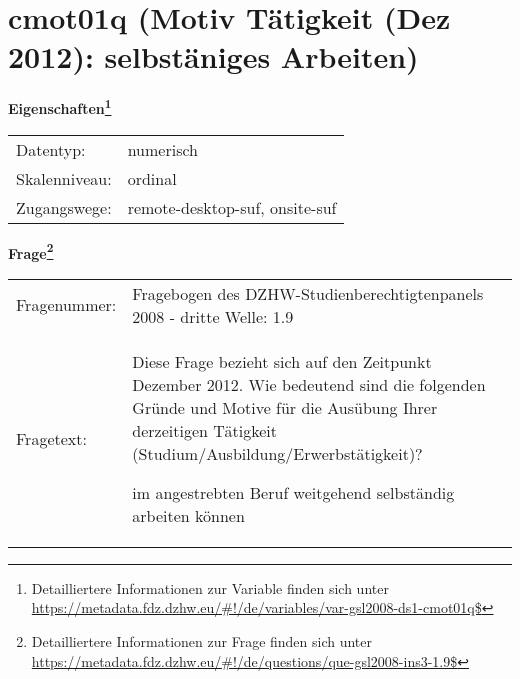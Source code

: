
    \setcounter{footnote}{0}

    \vspace*{-1.8cm}
	\section{cmot01q (Motiv Tätigkeit (Dez 2012): selbstäniges Arbeiten)}
	\label{section:cmot01q}



    \vspace*{0.5cm}
    \noindent\textbf{Eigenschaften\footnote{Detailliertere Informationen zur Variable finden sich unter
		\url{https://metadata.fdz.dzhw.eu/\#!/de/variables/var-gsl2008-ds1-cmot01q$}}}\\
	\begin{tabularx}{\hsize}{@{}lX}
	Datentyp: & numerisch \\
	Skalenniveau: & ordinal \\
	Zugangswege: &
	  remote-desktop-suf, 
	  onsite-suf
 \\
    \end{tabularx}



				\vspace*{0.5cm}
                \noindent\textbf{Frage\footnote{Detailliertere Informationen zur Frage finden sich unter
		              \url{https://metadata.fdz.dzhw.eu/\#!/de/questions/que-gsl2008-ins3-1.9$}}}\\
				\begin{tabularx}{\hsize}{@{}lX}
					Fragenummer: &
					  Fragebogen des DZHW-Studienberechtigtenpanels 2008 - dritte Welle:
					  1.9
 \\
					Fragetext: & Diese Frage bezieht sich auf den Zeitpunkt Dezember 2012. Wie bedeutend sind die folgenden Gründe und Motive für die Ausübung Ihrer derzeitigen Tätigkeit (Studium/Ausbildung/Erwerbstätigkeit)?\par  im angestrebten Beruf weitgehend selbständig arbeiten können \\
				\end{tabularx}





